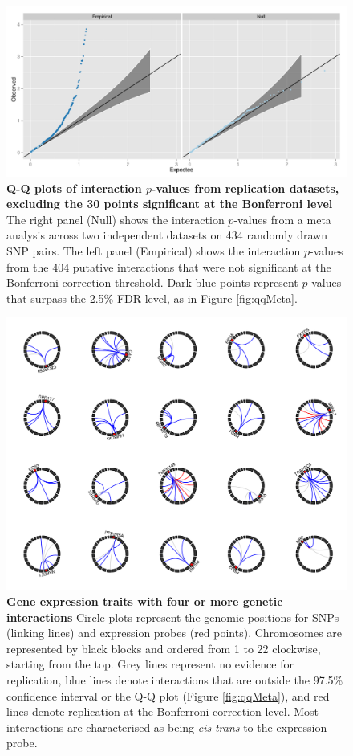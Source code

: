 \documentclass{article}
\begin{document}
\begin{figure}[H]
	\centering
	\includegraphics[width=5in]{qqMetaNonsig}
	\caption{\textbf{Q-Q plots of interaction $p$-values from replication datasets, excluding the 30 points significant at the Bonferroni level} The right panel (Null) shows the interaction $p$-values from a meta analysis across two independent datasets on 434 randomly drawn SNP pairs. The left panel (Empirical) shows the interaction $p$-values from the 404 putative interactions that were not significant at the Bonferroni correction threshold. Dark blue points represent $p$-values that surpass the 2.5\% FDR level, as in Figure \ref{fig:qqMeta}.}
\label{fig:qqMetaNonsig}
\end{figure}
\clearpage

\begin{figure}
	\centering
	\includegraphics[width=5in]{circles_replication2}
	\caption{\textbf{Gene expression traits with four or more genetic interactions} Circle plots represent the genomic positions for SNPs (linking lines) and expression probes (red points). Chromosomes are represented by black blocks and ordered from 1 to 22 clockwise, starting from the top. Grey lines represent no evidence for replication, blue lines denote interactions that are outside the 97.5\% confidence interval or the Q-Q plot (Figure \ref{fig:qqMeta}), and red lines denote replication at the Bonferroni correction level. Most interactions are characterised as being \emph{cis}-\emph{trans} to the expression probe.}
	\label{fig:circleplots}
\end{figure}
\clearpage
\end{document}
